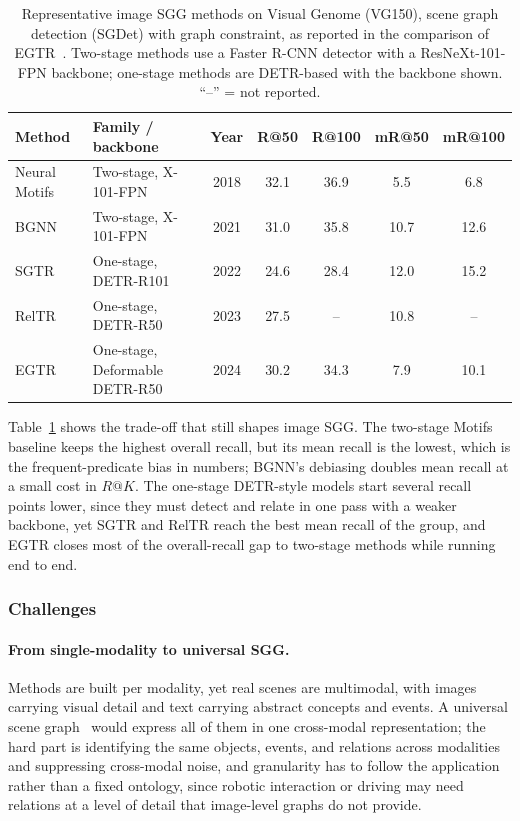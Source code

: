 \begin{table}[!t]
\centering
\caption{Representative image SGG methods on Visual Genome (VG150), scene graph detection (SGDet) with graph constraint, as reported in the comparison of EGTR~\cite{im2024egtr}. Two-stage methods use a Faster R-CNN detector with a ResNeXt-101-FPN backbone; one-stage methods are DETR-based with the backbone shown. ``--'' = not reported.}
\label{tab:sgg_performance}
\fontsize{9}{11}\selectfont
\setlength{\tabcolsep}{3.0mm}
\begin{tabular}{llccccc}
\toprule
\textbf{Method} & \textbf{Family / backbone} & \textbf{Year} & \textbf{R@50} & \textbf{R@100} & \textbf{mR@50} & \textbf{mR@100} \\
\midrule
Neural Motifs~\cite{zellers2018neural} & Two-stage, X-101-FPN & 2018 & 32.1 & 36.9 & 5.5 & 6.8 \\
BGNN~\cite{li2021bipartite}            & Two-stage, X-101-FPN & 2021 & 31.0 & 35.8 & 10.7 & 12.6 \\
SGTR~\cite{li2022sgtr}                 & One-stage, DETR-R101 & 2022 & 24.6 & 28.4 & 12.0 & 15.2 \\
RelTR~\cite{cong2023reltr}             & One-stage, DETR-R50  & 2023 & 27.5 & -- & 10.8 & -- \\
EGTR~\cite{im2024egtr}                 & One-stage, Deformable DETR-R50 & 2024 & 30.2 & 34.3 & 7.9 & 10.1 \\
\bottomrule
\end{tabular}
\end{table}

Table~\ref{tab:sgg_performance} shows the trade-off that still shapes image SGG. The two-stage Motifs baseline keeps the highest overall recall, but its mean recall is the lowest, which is the frequent-predicate bias in numbers; BGNN's debiasing doubles mean recall at a small cost in $R@K$. The one-stage DETR-style models start several recall points lower, since they must detect and relate in one pass with a weaker backbone, yet SGTR and RelTR reach the best mean recall of the group, and EGTR closes most of the overall-recall gap to two-stage methods while running end to end.


\subsubsection{Challenges}

\paragraph{From single-modality to universal SGG.}
Methods are built per modality, yet real scenes are multimodal, with images carrying visual detail and text carrying abstract concepts and events. A universal scene graph~\cite{wu2025universal} would express all of them in one cross-modal representation; the hard part is identifying the same objects, events, and relations across modalities and suppressing cross-modal noise, and granularity has to follow the application rather than a fixed ontology, since robotic interaction or driving may need relations at a level of detail that image-level graphs do not provide.

